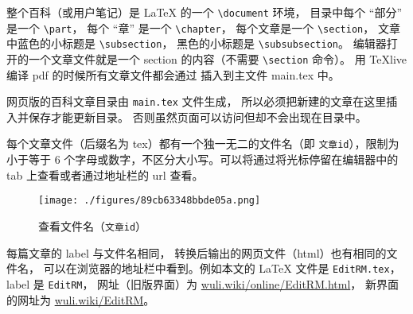 整个百科（或用户笔记）是 LaTeX 的一个 \verb|\document| 环境， 目录中每个 “部分” 是一个 \verb|\part|， 每个 “章” 是一个 \verb|\chapter|， 每个文章是一个 \verb|\section|， 文章中蓝色的小标题是 \verb|\subsection|， 黑色的小标题是 \verb|\subsubsection|。 编辑器打开的一个文章文件就是一个 section 的内容（不需要 \verb|\section| 命令）。 用 TeXlive 编译 pdf 的时候所有文章文件都会通过 \verb|| 插入到主文件 main.tex 中。

网页版的百科文章目录由 \verb|main.tex| 文件生成， 所以必须把新建的文章在这里插入并保存才能更新目录。 否则虽然页面可以访问但却不会出现在目录中。

每个文章文件（后缀名为 tex）都有一个独一无二的文件名（即 \verb`文章id`），限制为小于等于 6 个字母或数字，不区分大小写。可以将通过将光标停留在编辑器中的 tab 上查看或者通过地址栏的 url 查看。

\begin{figure}[ht]
\centering
\texttt{[image: ./figures/89cb63348bbde05a.png]}
\caption{查看文件名（\verb`文章id`）} \label{fig_editor_2}
\end{figure}

每篇文章的 label 与文件名相同， 转换后输出的网页文件（html）也有相同的文件名， 可以在浏览器的地址栏中看到。例如本文的 LaTeX 文件是 \verb|EditRM.tex|， label 是 \verb|EditRM|， 网址（旧版界面）为 \href{https://wuli.wiki/online/EditRM.html}{wuli.wiki/online/EditRM.html}， 新界面的网址为 \href{https://wuli.wiki/EditRM}{wuli.wiki/EditRM}。

